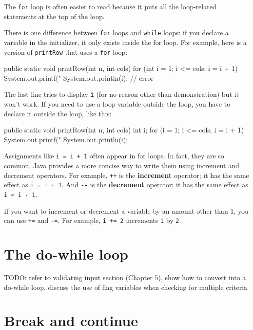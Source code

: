 \documentclass[12pt]{book}
\theoremstyle{exercise}
\newcommand{\java}[1]{\verb"#1"}
\begin{document}
The \java{for} loop is often easier to read because it puts all the loop-related statements at the top of the loop.

There is one difference between \java{for} loops and \java{while} loops: if you declare a variable in the initializer, it only exists inside the for loop.
For example, here is a version of \java{printRow} that uses a \java{for} loop:

\begin{code}
    public static void printRow(int n, int cols) {
        for (int i = 1; i <= cols; i = i + 1) {
            System.out.printf("%
        }
        System.out.println(i);   // error
    }
\end{code}

The last line tries to display \java{i} (for no reason other than demonstration) but it won't work.
If you need to use a loop variable outside the loop, you have to declare it outside the loop, like this:

\begin{code}
    public static void printRow(int n, int cols) {
        int i;
        for (i = 1; i <= cols; i = i + 1) {
            System.out.printf("%
        }
        System.out.println(i);
    }
\end{code}


Assignments like \java{i = i + 1} often appear in for loops.
In fact, they are so common, Java provides a more concise way to write them using increment and decrement operators.
For example, \java{++} is the {\bf increment} operator; it has the same effect as \java{i = i + 1}.
And \java{--} is the {\bf decrement} operator; it has the same effect as \java{i = i - 1}.

If you want to increment or decrement a variable by an amount other than 1, you can use \java{+=} and \java{-=}.
For example, \java{i += 2} increments \java{i} by \java{2}.


\section{The do-while loop}

TODO: refer to validating input section (Chapter 5), show how to convert into a do-while loop, discuss the use of flag variables when checking for multiple criteria


\section{Break and continue}
\end{document}
